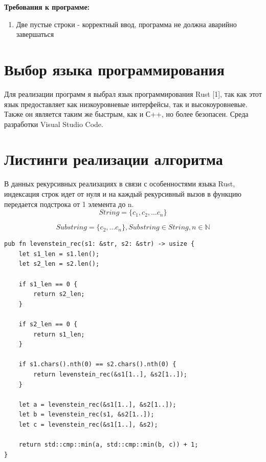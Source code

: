 \documentclass[12pt]{report}
\begin{document}
\textbf{Требования к программе:}

\begin{enumerate}
	\item Две пустые строки - корректный ввод, программа не должна аварийно завершаться
\end{enumerate}

\clearpage


\section{Выбор языка программирования}
Для реализации программ я выбрал язык программирования Rust [1], так как этот язык предоставляет как низкоуровневые интерфейсы, так и высокоуровневые. Также он является таким же быстрым, как и С++, но более безопасен. Среда разработки Visual Studio Code.

\section{Листинги реализации алгоритма}

В данных рекурсивных реализациях в связи с особенностями языка Rust, индексация строк идет от нуля и на каждый рекурсивный вызов в функцию передается подстрока от 1 элемента до n.
\begin{equation*} 
	String = \{ c_1, c_2, \dotso c_n \}
\end{equation*}

\begin{equation*}
	Substring = \{ c_2, \dotso c_n \},  Substring \in String, n \in \mathbb{N}
\end{equation*}
		
\begin{lstlisting}[label=some-code,caption=Функция нахождения расстояния Левенштейна рекурсивно]
pub fn levenstein_rec(s1: &str, s2: &str) -> usize {
	let s1_len = s1.len();
	let s2_len = s2.len();

	if s1_len == 0 {
		return s2_len;
	}

	if s2_len == 0 {
		return s1_len;
	}   

	if s1.chars().nth(0) == s2.chars().nth(0) {
		return levenstein_rec(&s1[1..], &s2[1..]);
	}

	let a = levenstein_rec(&s1[1..], &s2[1..]);
	let b = levenstein_rec(s1, &s2[1..]);
	let c = levenstein_rec(&s1[1..], &s2);

	return std::cmp::min(a, std::cmp::min(b, c)) + 1;
}
\end{lstlisting}
\end{document}
